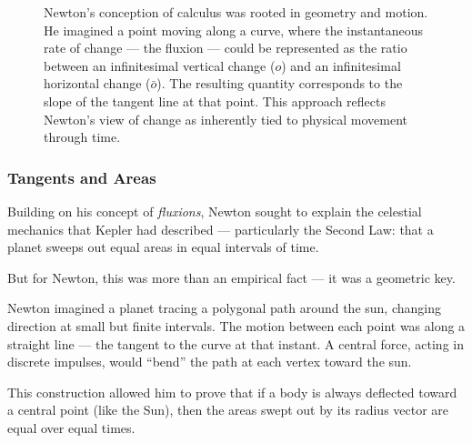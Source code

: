 \begin{figure}[H]
\centering
{}

\vspace{0.5em}
\caption{\small Newton's conception of calculus was rooted in geometry and motion. He imagined a point moving along a curve, where the instantaneous rate of change — the fluxion — could be represented as the ratio between an infinitesimal vertical change ($o$) and an infinitesimal horizontal change ($\bar{o}$). The resulting quantity corresponds to the slope of the tangent line at that point. This approach reflects Newton’s view of change as inherently tied to physical movement through time.}
\end{figure}




\subsubsection{Tangents and Areas} 

Building on his concept of \textit{fluxions}, Newton sought to explain the celestial mechanics that Kepler had described — particularly the Second Law: that a planet sweeps out equal areas in equal intervals of time.

But for Newton, this was more than an empirical fact — it was a geometric key.

Newton imagined a planet tracing a polygonal path around the sun, changing direction at small but finite intervals. The motion between each point was along a straight line — the tangent to the curve at that instant. A central force, acting in discrete impulses, would “bend” the path at each vertex toward the sun.

This construction allowed him to prove that if a body is always deflected toward a central point (like the Sun), then the areas swept out by its radius vector are equal over equal times.

